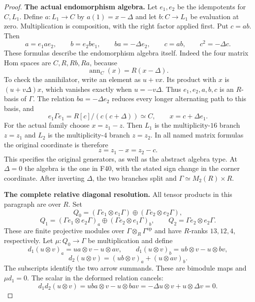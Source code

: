 \documentclass[11pt,a4paper]{article}
\newcommand{\fid}[1]{\textsf{#1}}\newcommand{\gate}[1]{\textsf{#1}}
\theoremstyle{named}\newtheorem{finding}{Finding}[section]
\theoremstyle{definition}\newtheorem{definition}[finding]{Definition}
\theoremstyle{remark}\newtheorem{remark}[finding]{Remark}
\begin{document}
\begin{proof}
\par\smallskip\noindent\textbf{The actual endomorphism algebra.}\quad
Let $e_1,e_2$ be the idempotents for $C,L_1$. Define
$a:L_1\to C$ by $a(1)=x-\Delta$ and let $b:C\to L_1$ be
evaluation at zero. Multiplication is composition, with the
right factor applied first. Put $c=ab$. Then
\begin{equation}\label{eq:relativearrows}
 a=e_1ae_2,\qquad b=e_2be_1,\qquad
 ba=-\Delta e_2,\qquad c=ab,\qquad c^2=-\Delta c.
\end{equation}
These formulas describe the endomorphism algebra itself.
Indeed the four matrix Hom spaces are $C,R,Rb,Ra$, because
\[
 \operatorname{ann}_C(x)=R(x-\Delta).
\]
To check the annihilator, write an element as $u+vx$.
Its product with $x$ is $(u+v\Delta)x$, which vanishes
exactly when $u=-v\Delta$. Thus $e_1,e_2,a,b,c$ is an
$R$-basis of $\Gamma$. The relation $ba=-\Delta e_2$
reduces every longer alternating path to this basis, and
\[
 e_1\Gamma e_1=R[c]/(c(c+\Delta))\simeq C,\qquad
 x=c+\Delta e_1.
\]
For the actual family choose $x=z_1-z$. Then $L_1$ is
the multiplicity-$16$ branch $z=z_1$ and $L_2$ is the
multiplicity-$4$ branch $z=z_2$. In all named matrix formulas
the original coordinate is therefore
\begin{equation}\label{eq:relativez}
 z=z_1-x=z_2-c.
\end{equation}
This specifies the original generators, as well as the abstract
algebra type. At $\Delta=0$ the algebra is the one in
\fid{F40}, with the stated sign change in the corner coordinate.
After inverting $\Delta$, the two branches split and
$\Gamma\simeq M_2(R)\times R$.

\par\smallskip\noindent\textbf{The complete relative diagonal resolution.}\quad
All tensor products in this paragraph are over $R$. Set
\[
 Q_0=(\Gamma e_1\otimes e_1\Gamma)
        \oplus(\Gamma e_2\otimes e_2\Gamma),
\]
\[
 Q_1=(\Gamma e_1\otimes e_2\Gamma)_a
        \oplus(\Gamma e_2\otimes e_1\Gamma)_b,\qquad
 Q_2=\Gamma e_2\otimes e_2\Gamma.
\]
These are finite projective modules over
$\Gamma\otimes_R\Gamma^{\mathrm{op}}$ and have $R$-ranks
$13,12,4$, respectively. Let $\mu:Q_0\to\Gamma$ be
multiplication and define
\[
 d_1(u\otimes v)_a=ua\otimes v-u\otimes av,\qquad
 d_1(u\otimes v)_b=ub\otimes v-u\otimes bv,
\]
\[
 d_2(u\otimes v)=(ub\otimes v)_a+(u\otimes av)_b.
\]
The subscripts identify the two arrow summands. These are
bimodule maps and $\mu d_1=0$. The scalar in the deformed
relation cancels:
\[
 d_1d_2(u\otimes v)=uba\otimes v-u\otimes bav
     =-\Delta u\otimes v+u\otimes\Delta v=0.
\]


\end{proof}
\end{document}
